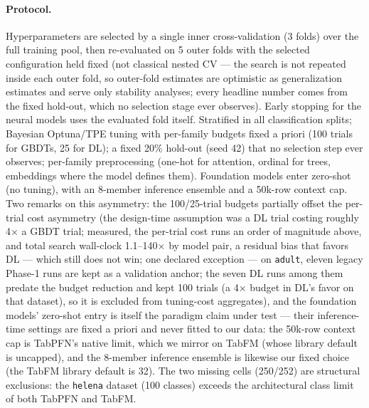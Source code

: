 \documentclass[11pt]{article}
\begin{document}
\paragraph{Protocol.} Hyperparameters are selected by a single inner
cross-validation (3 folds) over the full training pool, then re-evaluated
on 5 outer folds with the selected configuration held fixed (not classical
nested CV --- the search is not repeated inside each outer fold, so
outer-fold estimates are optimistic as generalization estimates and serve
only stability analyses; every headline number comes from the fixed
hold-out, which no selection stage ever observes). Early stopping for the
neural models uses the evaluated fold itself. Stratified in all
classification
splits; Bayesian Optuna/TPE
tuning \citep{akiba2019} with per-family budgets fixed a priori (100 trials
for GBDTs, 25 for DL); a fixed 20\%
hold-out (seed 42) that no selection step ever observes; per-family
preprocessing (one-hot for attention, ordinal for trees, embeddings where
the model defines them). Foundation models enter zero-shot (no tuning),
with an 8-member inference ensemble and a 50k-row context cap. Two remarks
on this asymmetry: the 100/25-trial budgets partially offset the
per-trial cost asymmetry (the design-time assumption was a DL trial
costing roughly 4$\times$ a GBDT trial; measured, the per-trial cost
runs an order of magnitude above, and total search wall-clock
1.1--140$\times$ by model pair, a residual bias
that favors DL --- which still does not win; one declared exception
--- on \texttt{adult}, eleven legacy Phase-1 runs are kept as a
validation anchor; the seven DL runs among them predate the budget
reduction and kept 100 trials (a 4$\times$ budget in DL's favor on that
dataset), so it is excluded from tuning-cost aggregates), and the foundation
models' zero-shot entry is itself the paradigm claim under test --- their
inference-time settings are fixed a priori and never fitted to our data:
the 50k-row context cap is TabPFN's native limit, which we mirror on
TabFM (whose library default is uncapped), and the 8-member inference
ensemble is likewise our fixed choice (the TabFM library default is 32).
The two
missing cells (250/252) are structural exclusions: the \texttt{helena}
dataset (100 classes) exceeds the architectural class limit of both TabPFN
and TabFM.
\end{document}
